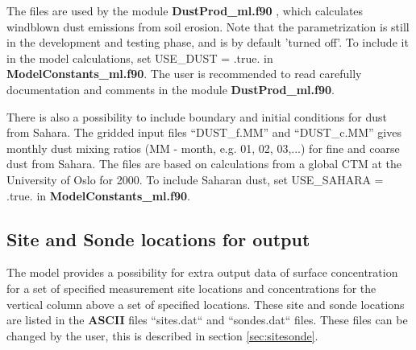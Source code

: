 The files are used by the module {\bf DustProd\_ml.f90 }, which calculates windblown dust 
emissions from soil erosion. Note that the parametrization is still in the development and 
testing phase, and is by default 'turned off'. To include it in the model calculations, set 
USE\_DUST = .true. in {\bf ModelConstants\_ml.f90}.
The user is recommended to read carefully documentation and
comments in the module {\bf DustProd\_ml.f90}.

There is also a possibility to include boundary and initial conditions for dust from Sahara. 
The gridded input files ``DUST\_f.MM'' and ``DUST\_c.MM'' gives monthly dust mixing 
ratios (MM - month, e.g. 01, 02, 03,...) for fine and coarse dust from Sahara. The files are based on calculations 
from a global CTM at the University of Oslo for 2000. 
To include Saharan dust, set USE\_SAHARA = .true. in {\bf ModelConstants\_ml.f90}.



\subsection{Site and Sonde locations for output}\label{sec:sitessondes_input}
The model provides a possibility for extra output data of surface concentration 
for a set of specified measurement site locations and concentrations for the vertical 
column above a set of specified locations. These site and sonde locations are listed 
in the {\bf ASCII} files ``sites.dat`` and ``sondes.dat`` files. These files can be 
changed by the user, this is described in section \ref{sec:sitesonde}.

